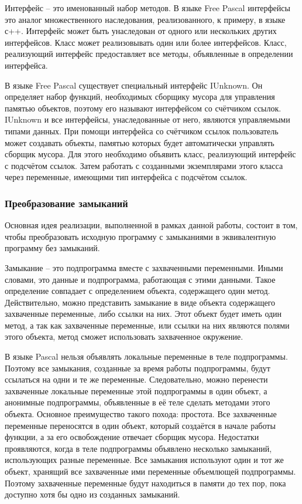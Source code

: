 \documentclass{imcs}
\begin{document}
Интерфейс -- это именованный набор методов. В языке Free Pascal интерфейсы это аналог множественного
наследования, реализованного, к примеру, в языке с++. Интерфейс может быть унаследован от одного или
нескольких других интерфейсов. Класс может реализовывать один или более интерфейсов.
Класс, реализующий интерфейс предоставляет все методы, объявленные в определении интерфейса\cite{refguide}.

В языке Free Pascal существует специальный интерфейс IUnknown. Он определяет
набор функций, необходимых сборщику мусора для управления памятью объектов, поэтому его называют
интерфейсом со счётчиком ссылок. IUnknown и все
интерфейсы, унаследованные от него, являются управляемыми типами данных.
При помощи интерфейса со счётчиком ссылок пользователь может создавать объекты,
памятью которых будет автоматически управлять сборщик мусора. Для этого необходимо
объявить класс, реализующий интерфейс с подсчётом ссылок. Затем работать с созданными
экземплярами этого класса через переменные, имеющими тип интерфейса с подсчётом ссылок.

\subsubsection{Преобразование замыканий}

Основная идея реализации, выполненной в рамках данной работы, состоит в том, чтобы преобразовать
исходную программу с замыканиями в эквивалентную программу без замыканий.

Замыкание -- это подпрограмма вместе с захваченными переменными. Иными словами, это данные и подпрограмма,
работающая с этими данными. Такое определение совпадает с определением объекта, содержащего один метод.
Действительно, можно представить замыкание в виде объекта содержащего захваченные переменные,
либо ссылки на них. Этот объект будет иметь один метод, а так как захваченные переменные, или ссылки на них
являются полями этого объекта, метод сможет использовать захваченное окружение.

В языке Pascal нельзя объявлять локальные переменные в теле подпрограммы. Поэтому все замыкания, созданные
за время работы подпрограммы, будут ссылаться на одни и те же переменные. Следовательно, можно перенести
захваченные локальные переменные этой подпрограммы в один объект, а анонимные подпрограммы, объявленные в её теле
сделать методами этого объекта. Основное преимущество такого похода: простота. Все захваченные переменные
переносятся в один объект, который создаётся в начале работы функции, а за его освобождение отвечает сборщик
мусора. Недостатки проявляются, когда в теле подпрограммы объявлено несколько замыканий, использующих разные
переменные. Все замыкания используют один и тот же объект, хранящий все захваченные ими переменные объемлющей
подпрограммы. Поэтому захваченные переменные будут находиться в памяти до тех пор, пока доступно хотя бы 
одно из созданных замыканий.
\end{document}
